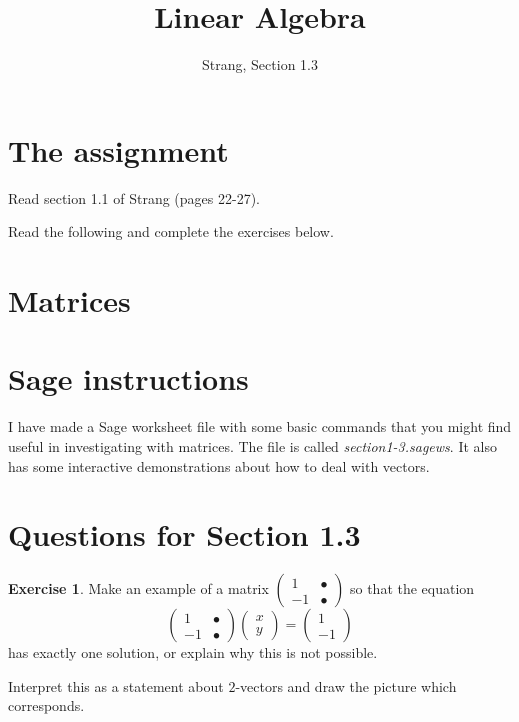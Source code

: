 \documentclass[11pt]{amsart}
\theoremstyle{definition}
\newtheorem{exercise}{Exercise}
\begin{document}
\title{Linear Algebra}
\author{Strang, Section 1.3}
\maketitle

\section{The assignment}
\begin{compactitem}
\item Read section 1.1 of Strang (pages 22-27).
\item Read the following and complete the exercises below.
\end{compactitem}

\section{Matrices}

\section{Sage instructions}

I have made a Sage worksheet file with some basic commands that you might find useful in investigating with matrices. The file is called \emph{section1-3.sagews}. It also has some interactive demonstrations about how to deal with vectors.


\section{Questions for Section 1.3}
\setcounter{exercise}{24}

\begin{exercise}
Make an example of a matrix $\left(\begin{smallmatrix} 1 & \bullet \\ -1 & \bullet \end{smallmatrix}\right)$ so that the equation
\[
\begin{pmatrix} 1 & \bullet \\ -1 & \bullet \end{pmatrix} \begin{pmatrix} x \\ y \end{pmatrix} = \begin{pmatrix} 1 \\ -1 \end{pmatrix}
\]
has exactly one solution, or explain why this is not possible.

Interpret this as a statement about $2$-vectors and draw the picture which corresponds.
\end{exercise}
\end{document}
